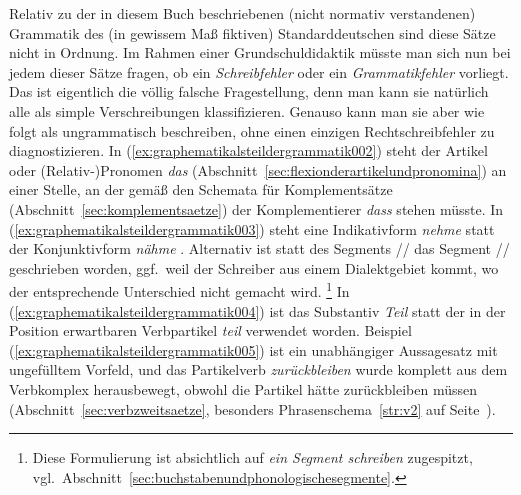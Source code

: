 \begin{exe}
  \ex\label{ex:graphematikalsteildergrammatik001}
  \begin{xlist}
  \end{xlist}
\end{exe}

Relativ zu der in diesem Buch beschriebenen (nicht normativ verstandenen) Grammatik des (in gewissem Maß fiktiven) Standarddeutschen sind diese Sätze nicht in Ordnung.
Im Rahmen einer Grundschuldidaktik müsste man sich nun bei jedem dieser Sätze fragen, ob ein \textit{Schreibfehler} oder ein \textit{Grammatikfehler} vorliegt.
Das ist eigentlich die völlig falsche Fragestellung, denn man kann sie natürlich alle als simple Verschreibungen klassifizieren.
Genauso kann man sie aber wie folgt als ungrammatisch beschreiben, ohne einen einzigen Rechtschreibfehler zu diagnostizieren.
In (\ref{ex:graphematikalsteildergrammatik002}) steht der Artikel oder (Relativ-)Pronomen \textit{das} (Abschnitt~\ref{sec:flexionderartikelundpronomina}) an einer Stelle, an der gemäß den Schemata für Komplementsätze (Abschnitt~\ref{sec:komplementsaetze}) der Komplementierer \textit{dass} stehen müsste.
In (\ref{ex:graphematikalsteildergrammatik003}) steht eine Indikativform \textit{nehme} \textipa{[ne:me]} statt der Konjunktivform \textit{nähme} \textipa{[nE:me]}.
Alternativ ist statt des Segments // das Segment // geschrieben worden, ggf.\ weil der Schreiber aus einem Dialektgebiet kommt, wo der entsprechende Unterschied nicht gemacht wird.%
\footnote{Diese Formulierung ist absichtlich auf \textit{ein Segment schreiben} zugespitzt, vgl.\ Abschnitt~\ref{sec:buchstabenundphonologischesegmente}.}
In (\ref{ex:graphematikalsteildergrammatik004}) ist das Substantiv \textit{Teil} statt der in der Position erwartbaren Verbpartikel \textit{teil} verwendet worden.
Beispiel (\ref{ex:graphematikalsteildergrammatik005}) ist ein unabhängiger Aussagesatz mit ungefülltem Vorfeld, und das Partikelverb \textit{zurückbleiben} wurde komplett aus dem Verbkomplex herausbewegt, obwohl die Partikel hätte zurückbleiben müssen (Abschnitt~\ref{sec:verbzweitsaetze}, besonders Phrasenschema~\ref{str:v2} auf Seite~\pageref{str:v2}).
